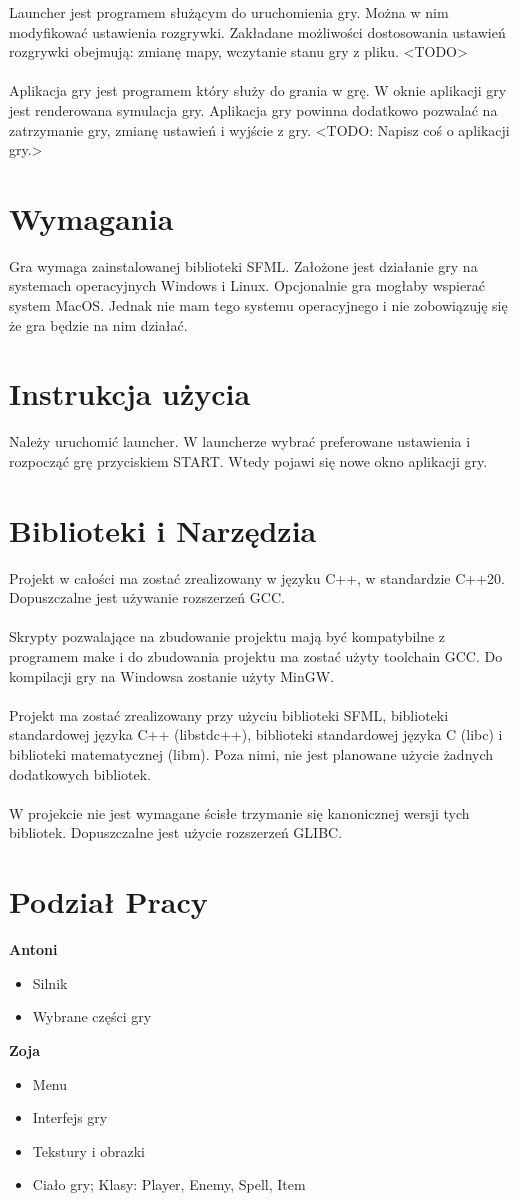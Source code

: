 \documentclass[12pt, titlepage]{article}
\begin{document}
\noindent
Launcher jest programem służącym do uruchomienia gry.
Można w nim modyfikować ustawienia rozgrywki. Zakładane
możliwości dostosowania ustawień rozgrywki obejmują:
zmianę mapy, wczytanie stanu gry z pliku. <TODO>
\\~\\
Aplikacja gry jest programem który służy
do grania w grę. W oknie aplikacji gry jest
renderowana symulacja gry. Aplikacja gry
powinna dodatkowo pozwalać na zatrzymanie
gry, zmianę ustawień i wyjście z gry. <TODO:
Napisz coś o aplikacji gry.>

\section{Wymagania}
Gra wymaga zainstalowanej biblioteki
SFML. Założone jest działanie gry
na systemach operacyjnych Windows i
Linux. Opcjonalnie gra mogłaby wspierać
system MacOS. Jednak nie mam tego
systemu operacyjnego i nie zobowiązuję
się że gra będzie na nim działać.

\newpage
\section{Instrukcja użycia}
Należy uruchomić launcher. W
launcherze wybrać preferowane
ustawienia i rozpocząć grę
przyciskiem START. Wtedy pojawi
się nowe okno aplikacji gry.

\section{Biblioteki i Narzędzia}
Projekt w całości ma zostać zrealizowany
w języku C++, w standardzie C++20.
Dopuszczalne jest używanie rozszerzeń
GCC.
\\~\\
Skrypty pozwalające na zbudowanie
projektu mają być kompatybilne z
programem make i do zbudowania
projektu ma zostać użyty toolchain
GCC. Do kompilacji gry na Windowsa
zostanie użyty MinGW.
\\~\\
Projekt ma zostać zrealizowany przy
użyciu biblioteki SFML, biblioteki
standardowej języka C++ (libstdc++),
biblioteki standardowej języka C (libc)
i biblioteki matematycznej (libm). Poza
nimi, nie jest planowane użycie żadnych
dodatkowych bibliotek.
\\~\\
W projekcie nie jest wymagane ścisłe
trzymanie się kanonicznej wersji tych
bibliotek. Dopuszczalne jest użycie
rozszerzeń GLIBC.

\section{Podział Pracy}
\textbf{Antoni}
\begin{itemize}
	\item Silnik
	\item Wybrane części gry
\end{itemize}
 
\noindent
\textbf{Zoja}
\begin{itemize}
	\item Menu
	\item Interfejs gry
	\item Tekstury i obrazki
	\item Ciało gry; Klasy: Player, Enemy, Spell, Item
\end{itemize}
\end{document}

